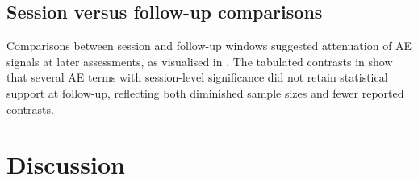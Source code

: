 \documentclass[11pt,a4paper]{article}
\begin{document}
\subsection{Session versus follow-up comparisons}
Comparisons between session and follow-up windows suggested attenuation of AE signals at later assessments, as visualised in . The tabulated contrasts in  show that several AE terms with session-level significance did not retain statistical support at follow-up, reflecting both diminished sample sizes and fewer reported contrasts.


\section{Discussion}
\end{document}
